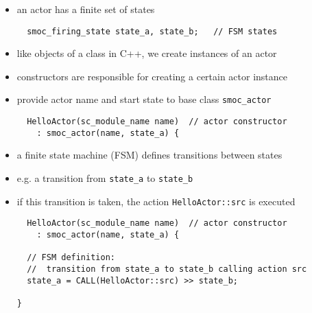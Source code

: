 \begin{frame}[fragile=singleslide]
\begin{itemize}
\item an actor has a finite set of states
\begin{lstlisting}
  smoc_firing_state state_a, state_b;   // FSM states
\end{lstlisting}
\item like objects of a class in C++, we create instances of an actor
\item constructors are responsible for creating a certain actor instance
\item provide actor name and start state to base class \lstinline!smoc_actor!
\begin{lstlisting}
  HelloActor(sc_module_name name)  // actor constructor
    : smoc_actor(name, state_a) {
\end{lstlisting}
\end{itemize}
\end{frame}




\begin{frame}[fragile=singleslide]
\begin{itemize}
\item a finite state machine (FSM) defines transitions between states
\item e.g. a transition from \lstinline!state_a! to \lstinline!state_b!
\item if this transition is taken, the action \lstinline!HelloActor::src! is executed
\begin{lstlisting}
  HelloActor(sc_module_name name)  // actor constructor
    : smoc_actor(name, state_a) {

  // FSM definition:
  //  transition from state_a to state_b calling action src
  state_a = CALL(HelloActor::src) >> state_b;

}
\end{lstlisting}
\end{itemize}
\end{frame}





